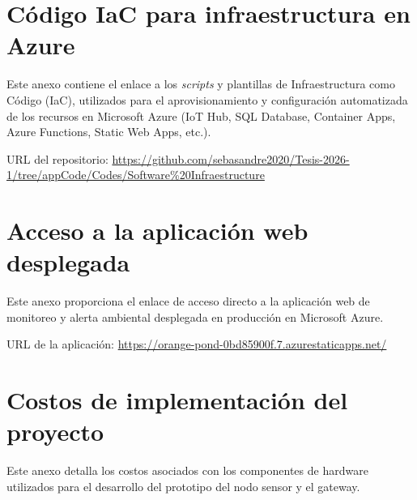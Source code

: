 \chapter{Código IaC para infraestructura en Azure}
\label{anexo:codigo_iac}
Este anexo contiene el enlace a los \textit{scripts} y plantillas de Infraestructura como Código (IaC), utilizados para el aprovisionamiento y configuración automatizada de los recursos en Microsoft Azure (IoT Hub, SQL Database, Container Apps, Azure Functions, Static Web Apps, etc.).

\begin{center}
    URL del repositorio: \href{https://github.com/sebasandre2020/Tesis-2026-1/tree/appCode/Codes/Software\%20Infraestructure}{https://github.com/sebasandre2020/Tesis-2026-1/tree/appCode/Codes/Software\%20Infraestructure}
\end{center}

\chapter{Acceso a la aplicación web desplegada}
\label{anexo:acceso_web}
Este anexo proporciona el enlace de acceso directo a la aplicación web de monitoreo y alerta ambiental desplegada en producción en Microsoft Azure.

\begin{center}
    URL de la aplicación: \href{https://orange-pond-0bd85900f.7.azurestaticapps.net/}{https://orange-pond-0bd85900f.7.azurestaticapps.net/}
\end{center}

\chapter{Costos de implementación del proyecto}
\label{anexo:tabla_costos}
Este anexo detalla los costos asociados con los componentes de hardware utilizados para el desarrollo del prototipo del nodo sensor y el gateway.


